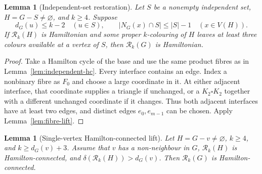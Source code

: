\documentclass[11pt]{article}
\newtheorem{lemma}[theorem]{Lemma}
\theoremstyle{remark}
\newcommand{\Rk}{\mathcal R_k}
\numberwithin{equation}{section}
\numberwithin{table}{section}
\begin{document}
\begin{lemma}[Independent-set restoration]
\label{lem:independent-restoration}
Let $S$ be a nonempty independent set, $H=G-S\ne\varnothing$, and
$k\ge4$.  Suppose
\[
 d_G(u)\le k-2\quad(u\in S),\qquad
 |N_G(x)\cap S|\le |S|-1\quad(x\in V(H)).
\]
If $\Rk(H)$ is Hamiltonian and some proper $k$-colouring of $H$ leaves
at least three colours available at a vertex of $S$, then $\Rk(G)$ is
Hamiltonian.
\end{lemma}

\begin{proof}
Take a Hamilton cycle of the base and use the same product fibres as in
Lemma~\ref{lem:independent-hc}.  Every interface contains an edge.
Index a nonbinary fibre as $F_0$ and choose a large coordinate in it.
At either adjacent interface, that coordinate supplies a triangle if
unchanged, or a $K_2\square K_2$ together with a different unchanged
coordinate if it changes.  Thus both adjacent interfaces have at least
two edges, and distinct edges $e_0,e_{m-1}$ can be chosen.  Apply
Lemma~\ref{lem:fibre-lift}.
\end{proof}

\begin{lemma}[Single-vertex Hamilton-connected lift]
\label{lem:single-hc}
Let $H=G-v\ne\varnothing$, $k\ge4$, and $k\ge d_G(v)+3$.
Assume that $v$ has a non-neighbour in $G$, $\Rk(H)$ is
Hamilton-connected, and $\delta(\Rk(H))>d_G(v)$.  Then $\Rk(G)$ is
Hamilton-connected.
\end{lemma}
\end{document}
